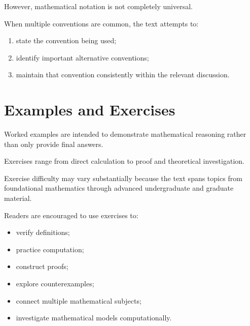 However, mathematical notation is not completely universal.

When multiple conventions are common, the text attempts to:

\begin{enumerate}

    \item state the convention being used;

    \item identify important alternative conventions;

    \item maintain that convention consistently within the relevant
          discussion.

\end{enumerate}

\section*{Examples and Exercises}

Worked examples are intended to demonstrate mathematical reasoning rather
than only provide final answers.

Exercises range from direct calculation to proof and theoretical
investigation.

Exercise difficulty may vary substantially because the text spans topics
from foundational mathematics through advanced undergraduate and graduate
material.

Readers are encouraged to use exercises to:

\begin{itemize}

    \item verify definitions;

    \item practice computation;

    \item construct proofs;

    \item explore counterexamples;

    \item connect multiple mathematical subjects;

    \item investigate mathematical models computationally.

\end{itemize}

